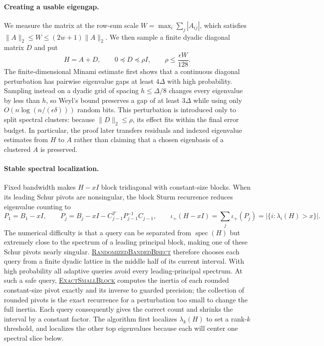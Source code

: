 \documentclass[11pt]{article}
\newcommand{\RandomizedBandedBisect}{%
  \textnormal{\textsc{Randomized\hspace{0pt}Banded\hspace{0pt}Bisect}}}
\newcommand{\ExactSmallBlock}{%
  \textnormal{\textsc{Exact\hspace{0pt}Small\hspace{0pt}Block}}}
\begin{document}
\paragraph{Creating a usable eigengap.}
We measure the matrix at the row-sum scale
$W=\max_i\sum_j|A_{ij}|$, which satisfies
$\lVert A\rVert_2\leq W\leq(2w+1)\lVert A\rVert_2$.  We then sample a
finite dyadic diagonal matrix $D$ and put
\[
 H=A+D,
 \qquad 0\preceq D\preceq\rho I,
 \qquad \rho\leq\frac{\epsilon W}{128}.
\]
The finite-dimensional Minami estimate first shows that a continuous
diagonal perturbation has pairwise eigenvalue gaps at least $4\Delta$ with
high probability.  Sampling instead on a dyadic grid of spacing
$h\leq\Delta/8$ changes every eigenvalue by less than $h$, so Weyl's bound
preserves a gap of at least $3\Delta$ while using only
$O(n\log(n/(\epsilon\delta)))$ random bits.  This perturbation is introduced
only to split spectral clusters: because $\lVert D\rVert_2\leq\rho$, its
effect fits within the final error budget.  In particular, the proof later
transfers residuals and indexed eigenvalue estimates from $H$ to $A$ rather
than claiming that a chosen eigenbasis of a clustered $A$ is preserved.

\paragraph{Stable spectral localization.}
Fixed bandwidth makes $H-xI$ block tridiagonal with constant-size blocks.
When its leading Schur pivots are nonsingular, the block Sturm recurrence
reduces eigenvalue counting to
\[
 P_1=B_1-xI,
 \qquad
 P_j=B_j-xI-C_{j-1}^TP_{j-1}^{-1}C_{j-1},
 \qquad
 \iota_+(H-xI)=\sum_j\iota_+(P_j)
 =|\{i:\lambda_i(H)>x\}|.
\]
The numerical difficulty is that a query can be separated from
$\operatorname{spec}(H)$ but extremely close to the spectrum of a leading
principal block, making one of these Schur pivots nearly singular.
\hyperref[alg:banded-bisect]{\RandomizedBandedBisect} therefore
chooses each query from a finite dyadic lattice in the middle half of its
current interval.  With high probability all adaptive queries avoid every
leading-principal spectrum.  At such a safe query,
\hyperref[alg:small-block]{\ExactSmallBlock} computes the inertia of
each rounded constant-size pivot exactly and its inverse to guarded
precision; the collection of rounded pivots is the exact recurrence for a
perturbation too small to change the full inertia.  Each query consequently
gives the correct count and shrinks the interval by a constant factor.  The
algorithm first localizes
$\lambda_k(H)$ to set a rank-$k$ threshold, and localizes the other top
eigenvalues because each will center one spectral slice below.
\end{document}
